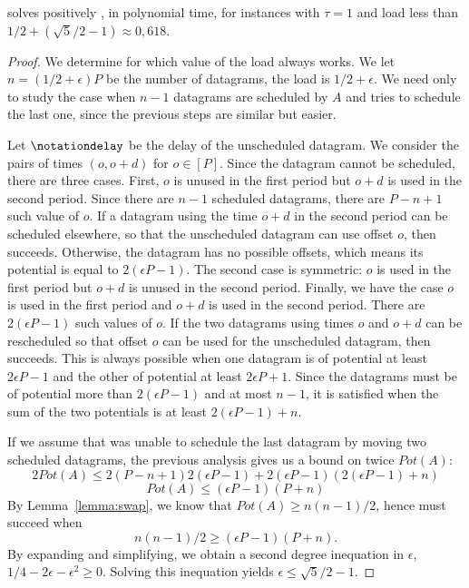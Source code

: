 \begin{theorem}
\swapandmove solves positively \pma, in polynomial time, for instances with $\tau =1$ and load less than $1/2 + (\sqrt{5}/2 -1) \approx 0,618$.
\end{theorem}

\begin{proof}
We determine for which value of the load \swapandmove always works. We let $n = (1/2 + \epsilon)P$ be the number of datagrams, the load is $1/2 + \epsilon$. We need only to study the case when $n-1$ datagrams are scheduled by $A$ and \swapandmove tries to schedule the last one, since the previous steps are similar but easier. 

Let $\notationdelay$ be the delay of the unscheduled datagram. We consider the pairs 
of times $(o,o+d)$ for $o \in [P]$. Since the datagram
cannot be scheduled, there are three cases. First, $o$ is unused in the first period but $o+d$ is used in the second period. Since there are $n-1$ scheduled datagrams, there are $P-n+1$ such value of $o$. If a datagram using the time $o+d$ in the second period can be scheduled elsewhere, so that the unscheduled datagram can use offset $o$, then \swapandmove succeeds.
Otherwise, the datagram has no possible offsets, which means its potential is equal to $2(\epsilon P -1)$.
The second case is symmetric: $o$ is used in the first period but $o+d$ is unused in the second period. 
Finally, we have the case $o$ is used in the first period and $o+d$ is used in the second period.  There are $2(\epsilon P -1)$ such values of $o$. If the two datagrams using times 
$o$ and $o+d$ can be rescheduled so that offset $o$ can be used for the unscheduled datagram,
then \swapandmove succeeds. This is always possible when one datagram is of potential at least $2\epsilon P -1$ and the other of potential at least $2\epsilon P + 1$. Since the datagrams must be of potential more than $2(\epsilon P -1)$ and at most $n-1$, it is satisfied when the sum of the two potentials is at least $2(\epsilon P -1) + n$.

If we assume that \swapandmove was unable to schedule the last datagram by moving two scheduled datagrams, the previous analysis gives us a bound on twice $Pot(A)$: 
$$ 2Pot(A) \leq 2(P-n+1) 2(\epsilon P -1) + 2(\epsilon P -1)(2(\epsilon P -1) + n) $$
$$ Pot(A) \leq (\epsilon P -1) (P + n)$$
By Lemma~\ref{lemma:swap}, we know that $Pot(A) \geq n(n-1)/2$, hence 
\swapandmove must succeed when
$$n(n-1)/2 \geq  (\epsilon P -1) (P + n).$$
By expanding and simplifying, we obtain a second degree inequation in $\epsilon$, $1/4 - 2\epsilon - \epsilon ^2 \geq  0$.
Solving this inequation yields $\epsilon \leq \sqrt{5}/2 -1$.



\end{proof}

